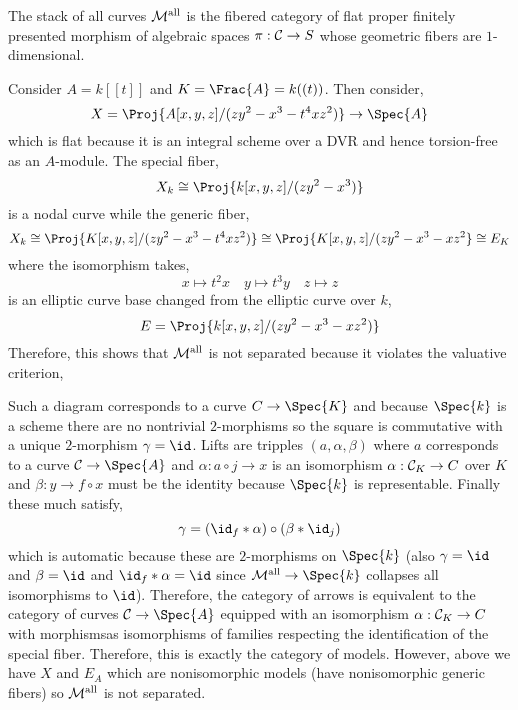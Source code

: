 \documentclass[12pt]{article}
\begin{document}
\begin{defn}
The stack of all curves $\mathcal{M}^{\text{all}}$ is the fibered category of flat proper finitely presented morphism of algebraic spaces $\pi : \mathcal{C} \to S$ whose geometric fibers are $1$-dimensional.
\end{defn}

\begin{example}
Consider $A = k[[t]]$ and $K = \Frac{A} = k((t))$. Then consider,
\[ X = \Proj{A[x,y,z]/(z y^2 - x^3 - t^4 x z^2)} \to \Spec{A} \] 
which is flat because it is an integral scheme over a DVR and hence torsion-free as an $A$-module. The special fiber,
\[ X_k \cong \Proj{k[x,y,z]/(z y^2 - x^3)} \]
is a nodal curve while the generic fiber,
\[ X_k \cong \Proj{K[x,y,z]/(z y^2 - x^3 - t^4 x z^2)} \cong \Proj{K[x,y,z]/(z y^2 - x^3 - x z^2} \cong E_K \]
where the isomorphism takes,
\[ x \mapsto t^2 x \quad y \mapsto t^3 y \quad z \mapsto z \]
is an elliptic curve base changed from the elliptic curve over $k$,
\[ E = \Proj{k[x,y,z]/(z y^2 - x^3 - x z^2)} \]
Therefore, this shows that $\mathcal{M}^{\text{all}}$ is not separated because it violates the valuative criterion,
\begin{center}
\end{center}
Such a diagram corresponds to a curve $C \to \Spec{K}$ and because $\Spec{k}$ is a scheme there are no nontrivial $2$-morphisms so the square is commutative with a unique $2$-morphism $\gamma = \id$. Lifts are tripples $(a, \alpha, \beta)$ where $a$ corresponds to a curve $\C \to \Spec{A}$ and $\alpha : a \circ j \to x$ is an isomorphism $\alpha : \mathcal{C}_K \to C$ over $K$ and $\beta : y \to f \circ x$ must be the identity because $\Spec{k}$ is representable. Finally these much satisfy,
\[ \gamma = (\id_f * \alpha) \circ (\beta * \id_j) \]
which is automatic because these are $2$-morphisms on $\Spec{k}$ (also $\gamma = \id$ and $\beta = \id$ and $\id_f * \alpha = \id$ since $\Mall \to \Spec{k}$ collapses all isomorphisms to $\id$). Therefore, the category of arrows is equivalent to the category of curves $\C \to \Spec{A}$ equipped with an isomorphism $\alpha : \mathcal{C}_K \to C$ with morphismsas isomorphisms of families respecting the identification of the special fiber. Therefore, this is exactly the category of models. However, above we have $X$ and $E_A$ which are nonisomorphic models (have nonisomorphic generic fibers) so $\mathcal{M}^{\text{all}}$ is not separated. 

\end{example}
\end{document}
